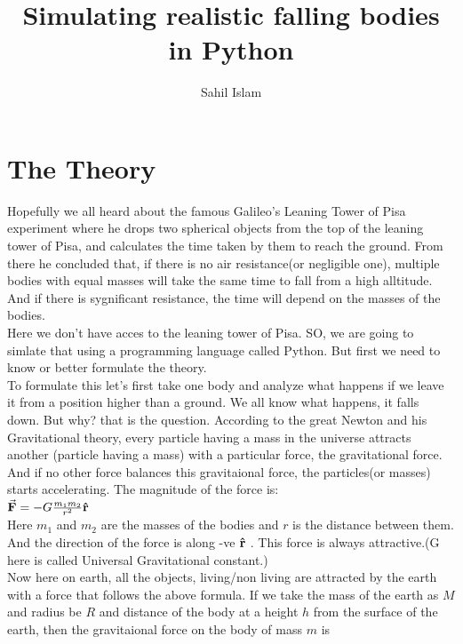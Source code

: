 \documentclass[24pt]{article}
\begin{document}
\title{Simulating realistic falling bodies in Python}
\author{Sahil Islam}
\date{}
\maketitle

\section*{The Theory}
Hopefully we all heard about the famous Galileo's Leaning Tower of Pisa experiment
where he drops two spherical objects from the top of the leaning tower of Pisa, and 
calculates the time taken by them to reach the ground. From there he concluded that, if there is no air resistance(or negligible one), multiple bodies with equal masses will take the same time to fall from a high alltitude. And if there is sygnificant resistance, the time will depend on the masses of the bodies. \\
Here we don't have acces to the leaning tower of Pisa. SO, we are going to simlate that using a programming language called Python. But first we need to know or better formulate the theory.\\
To formulate this let's first take one body and analyze what happens if we leave it  from a position higher than a ground. We all know what happens, it falls down. But why? that is the question. According to the great Newton and his Gravitational theory, every particle having a mass in the universe attracts another (particle having a mass) with a particular force, the gravitational force. And if no other force balances this gravitaional force, the particles(or masses) starts accelerating. The magnitude of the force is: \\

$\va{F}=-G \frac{m_1 m_2}{r^2} \vu{r} $
\\

Here $m_1$ and $m_2$ are the masses of the bodies and $r$ is the distance between them. And the direction of the force is along -ve $ \vu{r}$ . This force is always attractive.(G here is called Universal Gravitational constant.)\\
Now here on earth, all the objects, living/non living are attracted by the earth with a force that follows the above formula. If we take the mass of the earth as $M$ and radius be $R$ and distance of the body at a height $h$ from the surface of the earth, then the gravitaional force on the body of mass $m$ is \\
\end{document}
